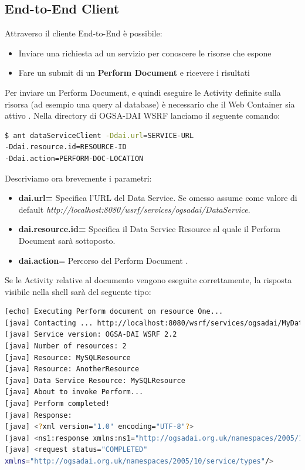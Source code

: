 \documentclass[11pt]{article}
\begin{document}
\subsection{End-to-End Client}

Attraverso il cliente End-to-End è possibile: 

\begin{itemize}
	\item Inviare una richiesta ad un servizio per conoscere le risorse che espone
	\item Fare un submit di un \textbf{Perform Document} e ricevere i risultati 
\end{itemize}

Per inviare un Perform Document, e quindi eseguire le Activity definite sulla risorsa (ad esempio una query al database) è necessario che il Web Container sia attivo \cite{ogsadai}. 
Nella directory di OGSA-DAI WSRF lanciamo il seguente comando: 

\begin{lstlisting}[language=bash]
$ ant dataServiceClient -Ddai.url=SERVICE-URL
-Ddai.resource.id=RESOURCE-ID
-Ddai.action=PERFORM-DOC-LOCATION
\end{lstlisting}

Descriviamo ora brevemente i parametri: 

\begin{itemize}
	\item \textbf{dai.url=} Specifica l'URL del Data Service. Se omesso assume come valore di default \emph{http://localhost:8080/wsrf/services/ogsadai/DataService}.
	\item \textbf{dai.resource.id=} Specifica il Data Service Resource al quale il Perform Document sarà sottoposto. 
	\item \textbf{dai.action}= Percorso del Perform Document \cite{ogsadai}.
\end{itemize}

Se le Activity relative al documento vengono eseguite correttamente, la risposta visibile nella shell sarà del seguente tipo: 
\begin{lstlisting}[language=bash]
[echo] Executing Perform document on resource One...
[java] Contacting ... http://localhost:8080/wsrf/services/ogsadai/MyDataService
[java] Service version: OGSA-DAI WSRF 2.2
[java] Number of resources: 2
[java] Resource: MySQLResource
[java] Resource: AnotherResource
[java] Data Service Resource: MySQLResource
[java] About to invoke Perform...
[java] Perform completed!
[java] Response: 
[java] <?xml version="1.0" encoding="UTF-8"?>
[java] <ns1:response xmlns:ns1="http://ogsadai.org.uk/namespaces/2005/10/types">
[java] <request status="COMPLETED"
xmlns="http://ogsadai.org.uk/namespaces/2005/10/service/types"/>

\end{lstlisting}
\end{document}
